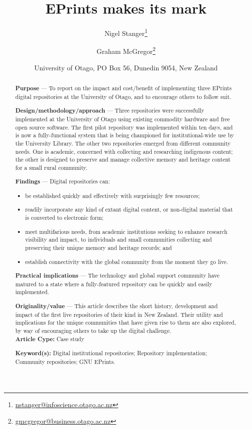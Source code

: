 \documentclass[12pt,pdftex,a4paper,titlepage]{article}
\title{EPrints makes its mark}
\author{Nigel Stanger\thanks{\protect\url{nstanger@infoscience.otago.ac.nz}} \and Graham McGregor\thanks{\protect\url{gmcgregor@business.otago.ac.nz}}}
\date{University of Otago, PO Box 56, Dunedin 9054, New Zealand}
\begin{document}
\maketitle





\begin{abstract}

\noindent\textbf{Purpose} --- To report on the impact and cost/benefit of implementing three EPrints digital repositories at the University of Otago, and to encourage others to follow suit.

\noindent\textbf{Design/methodology/approach} --- Three repositories were successfully implemented at the University of Otago using existing commodity hardware and free open source software. The first pilot repository was implemented within ten days, and is now a fully-functional system that is being championed for institutional-wide use by the University Library. The other two repositories emerged from different community needs. One is academic, concerned with collecting and researching indigenous content; the other is designed to preserve and manage collective memory and heritage content for a small rural community.

\noindent\textbf{Findings} --- Digital repositories can:
\begin{itemize}

	\item be established quickly and effectively with surprisingly few resources;
	
	\item readily incorporate any kind of extant digital content, or non-digital material that is converted to electronic form;
	
	\item meet multifarious needs, from academic institutions seeking to enhance research visibility and impact, to individuals and small communities collecting and preserving their unique memory and heritage records; and
	
	\item establish connectivity with the global community from the moment they go live.

\end{itemize}

\noindent\textbf{Practical implications} --- The technology and global support community have matured to a state where a fully-featured repository can be quickly and easily implemented.

\noindent\textbf{Originality/value} --- This article describes the short history, development and impact of the first live repositories of their kind in New Zealand. Their utility and implications for the unique communities that have given rise to them are also explored, by way of encouraging others to take up the digital challenge. \\

\noindent \textbf{Article Cype:} Case study

\noindent \textbf{Keyword(s):} Digital institutional repositories; Repository implementation; Community repositories; GNU EPrints.
\end{abstract}
\end{document}

